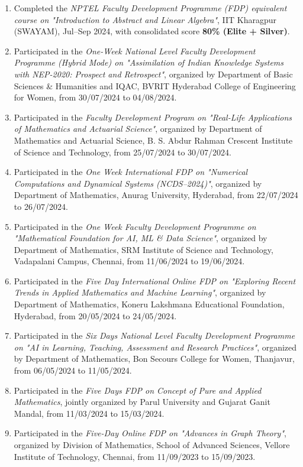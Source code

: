 \begin{enumerate}[label=\protect\circled{\arabic*}, leftmargin=*, itemsep=1ex]
\item Completed the \emph{NPTEL Faculty Development Programme (FDP) equivalent course on "Introduction to Abstract and Linear Algebra"}, IIT Kharagpur (SWAYAM), Jul--Sep 2024, with consolidated score \textbf{80\% (Elite + Silver)}.

\item Participated in the \emph{One-Week National Level Faculty Development Programme (Hybrid Mode) on "Assimilation of Indian Knowledge Systems with NEP-2020: Prospect and Retrospect"}, organized by Department of Basic Sciences \& Humanities and IQAC, BVRIT Hyderabad College of Engineering for Women, from 30/07/2024 to 04/08/2024.

\item Participated in the \emph{Faculty Development Program on "Real-Life Applications of Mathematics and Actuarial Science"}, organized by Department of Mathematics and Actuarial Science, B. S. Abdur Rahman Crescent Institute of Science and Technology, from 25/07/2024 to 30/07/2024.

\item Participated in the \emph{One Week International FDP on "Numerical Computations and Dynamical Systems (NCDS--2024)"}, organized by Department of Mathematics, Anurag University, Hyderabad, from 22/07/2024 to 26/07/2024.

\item Participated in the \emph{One Week Faculty Development Programme on "Mathematical Foundation for AI, ML \& Data Science"}, organized by Department of Mathematics, SRM Institute of Science and Technology, Vadapalani Campus, Chennai, from 11/06/2024 to 19/06/2024.

\item Participated in the \emph{Five Day International Online FDP on "Exploring Recent Trends in Applied Mathematics and Machine Learning"}, organized by Department of Mathematics, Koneru Lakshmana Educational Foundation, Hyderabad, from 20/05/2024 to 24/05/2024.

\item Participated in the \emph{Six Days National Level Faculty Development Programme on "AI in Learning, Teaching, Assessment and Research Practices"}, organized by Department of Mathematics, Bon Secours College for Women, Thanjavur, from 06/05/2024 to 11/05/2024.

\item Participated in the \emph{Five Days FDP on Concept of Pure and Applied Mathematics}, jointly organized by Parul University and Gujarat Ganit Mandal, from 11/03/2024 to 15/03/2024.

\item Participated in the \emph{Five-Day Online FDP on "Advances in Graph Theory"}, organized by Division of Mathematics, School of Advanced Sciences, Vellore Institute of Technology, Chennai, from 11/09/2023 to 15/09/2023.
\end{enumerate}

